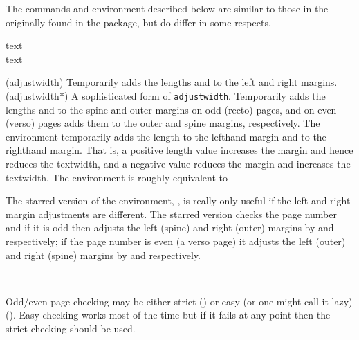 The commands and environment described below are similar to those in
the originally found in the  package, but do differ in
some respects.

\begin{syntax}
 text  \\
 text  \\
\end{syntax}
\glossary(adjustwidth)%
  {}%
  {Temporarily adds the lengths  and  to the left
   and right margins.}
\glossary(adjustwidth*)%
  {}%
  {A sophisticated form of \texttt{adjustwidth}. 
   Temporarily adds the lengths  and  to the spine
   and outer margins on odd (recto) pages, and on even (verso) pages adds
   them to the outer and spine margins, respectively.}
The  environment temporarily adds the length 
to the lefthand margin and  to the righthand 
margin. That is, a positive length value increases the 
margin and hence reduces the textwidth,
and a negative value reduces the margin and increases the 
textwidth. The  environment is roughly equivalent to
\begin{lcode}
\begin{adjustwidth}{2.5em}{2.5em}
\end{lcode}

    The starred version of the environment, , is really only
useful if the left and right margin adjustments are different. 
The starred version checks the page number and if it is odd then adjusts 
the left (spine) and right (outer) margins 
by  and  respectively; if the page number is even 
(a verso page) it adjusts the left (outer) and right (spine) 
margins by  and  respectively.

\begin{syntax}
\cmd{\strictpagecheck} \cmd{\easypagecheck} \\
\end{syntax}

Odd/even page checking may be either strict (\cmd{\strictpagecheck})
or easy (or one might call it lazy) (\cmd{\easypagecheck}). Easy
checking works most of the time but if it fails at any point then the
strict checking should be used.

